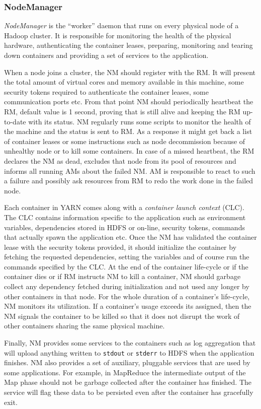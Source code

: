\subsubsection{NodeManager}
\label{sssec:nm}
\emph{NodeManager} is the ``worker'' daemon that runs on every
physical node of a Hadoop cluster. It is responsible for monitoring
the health of the physical hardware, authenticating the container
leases, preparing, monitoring and tearing down containers and
providing a set of services to the application.

When a node joins a cluster, the NM should register with the
RM. It will present the total amount of virtual cores and memory
available in this machine, some security tokens required to
authenticate the container leases, some communication ports etc. From
that point NM should periodically heartbeat the RM, default value is 1
second, proving that is still alive and keeping the RM up-to-date with
its status. NM regularly runs some scripts to monitor the
health of the machine and the status is sent to RM. As a response it
might get back a list of container leases or some instructions such as
node decommission because of unhealthy node or to kill some
containers. In case of a missed heartbeat, the RM declares the NM as
dead, excludes that node from its pool of resources and informs all
running AMs about the failed NM. AM is responsible to react to such a
failure and possibly ask resources from RM to redo the work done in
the failed node.

Each container in YARN comes along with a \emph{container launch
  context} (CLC). The CLC contains information specific to the
application such as environment variables,
dependencies stored in HDFS or on-line, security tokens, commands that
actually spawn the application etc. Once the NM has validated the
container lease with the security tokens provided, it should
initialize the container by fetching the requested dependencies,
setting the variables and of course run the commands specified by the
CLC. At the end of the container life-cycle or if the container dies
or if RM instructs NM to kill a container, NM should garbage collect
any dependency fetched during initialization and not used any
longer by other containers in that node. For the whole duration of a
container's life-cycle, NM monitors its utilization. If a container's
usage exceeds its assigned, then the NM signals the container to be
killed so that it does not disrupt the work of other containers
sharing the same physical machine. 

Finally, NM provides some services to the containers such as log
aggregation that will upload anything written to \texttt{stdout} or \texttt{stderr} to
HDFS when the application finishes. NM also provides a set of
auxiliary, pluggable services that are used by some applications. For
example, in MapReduce the intermediate output of the Map phase should
not be garbage collected after the container has finished. The
service will flag these data to be persisted even after the container
has gracefully exit.

